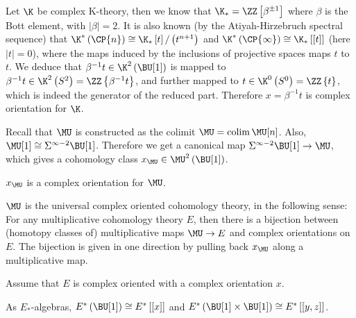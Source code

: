 \begin{example}\label{k-thy-oriented}
	Let $\K$ be complex K-theory, then we know that $\K_* = \ZZ\left[\beta^{\pm 1}\right]$ where $\beta$ is the Bott element, with $\left|\beta\right| = 2$.
	It is also known (by the Atiyah-Hirzebruch spectral sequence) that
	$\K^*\left(\CP{n}\right) \cong \K_* \left[t\right] / \left(t^{n+1}\right)$
	and
	$\K^*\left(\CP{\infty}\right) \cong \K_* \left[\left[t\right]\right]$
	(here $\left|t\right| = 0$),
	where the maps induced by the inclusions of projective spaces maps $t$ to $t$.
	We deduce that $\beta^{-1} t \in \K^2\left(\BU[1]\right)$ is mapped to $\beta^{-1} t \in \K^2\left(S^2\right) = \ZZ\left\{\beta^{-1} t\right\}$, and further mapped to $t \in \K^0\left(S^0\right) = \ZZ\left\{t\right\}$, which is indeed the generator of the reduced part.
	Therefore $x = \beta^{-1} t$ is complex orientation for $\K$.
\end{example}

\begin{example}
	Recall that $\MU$ is constructed as the colimit $\MU = \colim \MU[n]$.
	Also, $\MU[1] \cong \Sigma^{\infty-2} \BU[1]$.
	Therefore we get a canonical map $\Sigma^{\infty-2} \BU[1] \to \MU$, which gives a cohomology class $x_{\MU} \in \MU^2\left(\BU[1]\right)$.
\end{example}

\begin{proposition}
	$x_{\MU}$ is a complex orientation for $\MU$.
\end{proposition}

\begin{theorem}
	$\MU$ is the universal complex oriented cohomology theory, in the following sense:
	For any multiplicative cohomology theory $E$, then there is a bijection between (homotopy classes of) multiplicative maps $\MU \to E$ and complex orientations on $E$.
	The bijection is given in one direction by pulling back $x_{\MU}$ along a multiplicative map.
\end{theorem}

Assume that $E$ is complex oriented with a complex orientation $x$.

\begin{proposition}
	As $E_*$-algebras,
	$E^*\left(\BU[1]\right) \cong E^*\left[\left[x\right]\right]$
	and
	$E^*\left(\BU[1] \times \BU[1]\right) \cong E^*\left[\left[y,z\right]\right]$.
\end{proposition}

